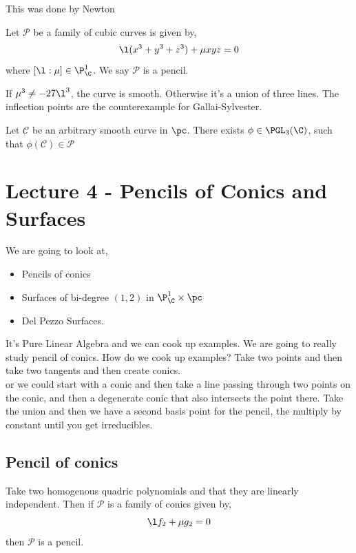 \documentclass{article}
\begin{document}
This was done by Newton


\begin{ndefi}
  Let $\mathcal{P}$ be a family of cubic curves is given by,
  \begin{equation}
    \l (x^3 + y^3 + z^3) + \mu xyz = 0
  \end{equation}
  where $[\l : \mu] \in \P_\C^1$. We say $\mathcal{P}$ is a pencil.
\end{ndefi}
If $\mu^3 \ne -27\l ^3$, the curve is smooth. Otherwise it's a union of three lines. The inflection points are the counterexample for Gallai-Sylvester.

\begin{nthm}
  Let $\mathcal{C}$ be an arbitrary smooth curve in $\pc$. There exists $\phi \in \PGL_3(\C)$, such that $\phi(\mathcal{C}) \in \mathcal{P}$
\end{nthm}

\section{Lecture 4 - Pencils of Conics and Surfaces}
We are going to look at,
\begin{itemize}
  \item Pencils of conics
  \item Surfaces of bi-degree $(1, 2)$ in $\P^1_\C \times \pc$
  \item Del Pezzo Surfaces.
\end{itemize}

It's Pure Linear Algebra and we can cook up examples. We are going to really study pencil of conics. How do we cook up examples? Take two points and then take two tangents and then create conics.\\

or we could start with a conic and then take a line passing through two points on the conic, and then a degenerate conic that also intersects the point there. Take the union and then we have a second basis point for the pencil, the multiply by constant until you get irreducibles.

\subsection{Pencil of conics}
Take two homogenous quadric polynomials and that they are linearly independent.
Then if $\mathcal{P}$ is a family of conics given by,
$$ \l f_2 + \mu g_2 = 0$$
then $\mathcal{P}$ is a pencil.\\
\end{document}
